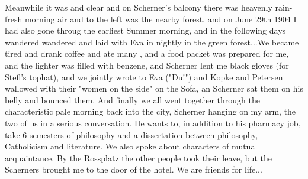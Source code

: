 Meanwhile it was  and clear and on Scherner's balcony there was heavenly rain-fresh morning air and to the left  was the nearby forest, and on June 29th 1904 I had also gone throug the earliest Summer morning, and in the following days wandered wandered and laid with Eva in nightly in the green forest...We became tired and drank coffee and ate many , and a food packet was prepared for me, and the lighter was filled with benzene, and Scherner lent me black gloves (for Stefl's tophat), and we jointly wrote to Eva ("Du!") and Kopke and Petersen wallowed with their "women on the side" on the Sofa, an Scherner sat them on his belly and bounced them. And finally we all went together through the characteristic pale morning back into the city, Scherner hanging on my arm, the two of us in a serious conversation. He wants to, in addition to his pharmacy job, take 6 semesters of philosophy and a dissertation between philosophy, Catholicism and literature. We also spoke about characters of mutual acquaintance. By the Rossplatz the other people took their leave, but the Scherners brought me to the door of the hotel. We are friends for life...

